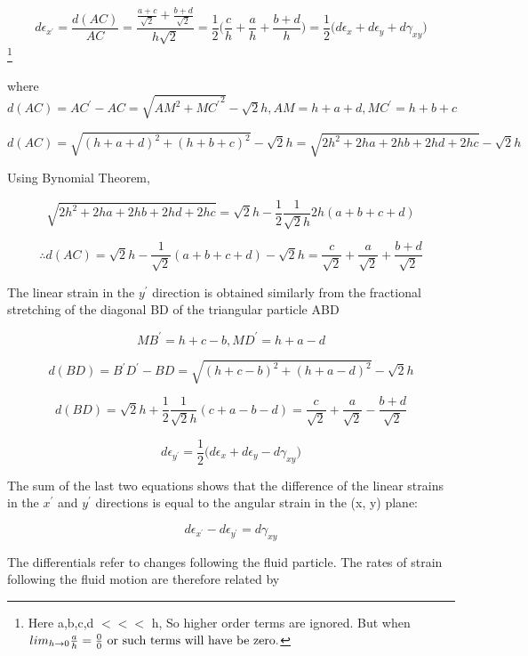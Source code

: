 \documentclass{article}
\begin{document}
{\begin{equation}\label{e22}
d\epsilon_{x^{'}} = \frac{d(AC)}{AC} = \frac{\frac{a+c}{\sqrt{2}}+\frac{b+d}{\sqrt{2}}}{h\sqrt{2}} = \frac{1}{2}\bigg(\frac{c}{h} + \frac{a}{h} + \frac{b+d}{h}\bigg) = \frac{1}{2}\bigg(d\epsilon_{x} + d\epsilon_{y} + d\gamma_{xy}\bigg)
\end{equation}\footnote{Here a,b,c,d $<<<$ h, So higher order terms are ignored. But when $\\lim_{h\to 0}\frac{a}{h}=\frac{0}{0} \text{ or such terms will have be zero.}$  }

where $d(AC) = AC^{'}-AC = \sqrt{AM^{2}+{MC^{'}}^{2}}- \sqrt{2}h, AM = h+a+d, MC^{'}=h+b+c$

$$d(AC) = \sqrt{(h+a+d)^{2} + (h+b+c)^{2}} - \sqrt{2}h = \sqrt{2h^{2} + 2ha + 2hb + 2hd + 2hc} - \sqrt{2}h$$

Using Bynomial Theorem,

$$\sqrt{2h^{2} + 2ha + 2hb + 2hd + 2hc} = \sqrt{2}h - \frac{1}{2}\frac{1}{\sqrt{2}h}2h(a+b+c+d)$$

$$\therefore d(AC) = \sqrt{2}h - \frac{1}{\sqrt{2}}(a+b+c+d) - \sqrt{2}h = \frac{c}{\sqrt{2}} + \frac{a}{\sqrt{2}} + \frac{b+d}{\sqrt{2}}$$

The linear strain in the $y^{'}$ direction is obtained similarly from the fractional stretching of the diagonal BD of the triangular particle ABD 

$$MB^{'} = h+c-b, MD^{'} = h+a-d$$

$$d(BD) = B^{'}D^{'} - BD = \sqrt{(h+c-b)^{2} + (h+a-d)^{2}} - \sqrt{2}h$$

$$d(BD) = \sqrt{2}h + \frac{1}{2}\frac{1}{\sqrt{2}h}(c+a-b-d) = \frac{c}{\sqrt{2}} + \frac{a}{\sqrt{2}} - \frac{b+d}{\sqrt{2}}$$

\begin{equation}\label{e23}
d\epsilon_{y^{'}} = \frac{1}{2}\bigg(d\epsilon_{x} + d\epsilon_{y} - d\gamma_{xy}\bigg)
\end{equation}

The sum of the last two equations shows that the difference of the linear strains in the $x^{'}$
and $y^{'}$ directions is equal to the angular strain in the (x, y) plane:

\begin{equation} \label{e24}
d\epsilon_{x^{'}} - d\epsilon_{y^{'}} = d\gamma_{xy}
\end{equation}

The differentials refer to changes following the fluid particle. The rates of strain following
the fluid motion are therefore related by

}
\end{document}
